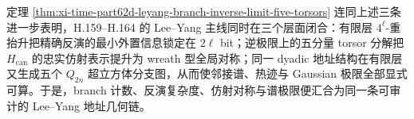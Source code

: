 \noindent
定理 \ref{thm:xi-time-part62d-leyang-branch-inverse-limit-five-torsors} 连同上述三条进一步表明，H.159--H.164 的 Lee--Yang 主线同时在三个层面闭合：有限层 \(4^\ell\)-重抬升把精确反演的最小外置信息锁定在 \(2\ell\) bit；逆极限上的五分量 torsor 分解把 \(H_{\mathrm{can}}\) 的忠实仿射表示提升为 wreath 型全局对称；同一 dyadic 地址结构在有限层又生成五个 \(Q_{2n}\) 超立方体分支图，从而使邻接谱、热迹与 Gaussian 极限全部显式可算。于是，branch 计数、反演复杂度、仿射对称与谱极限便汇合为同一条可审计的 Lee--Yang 地址几何链。

\endinput
